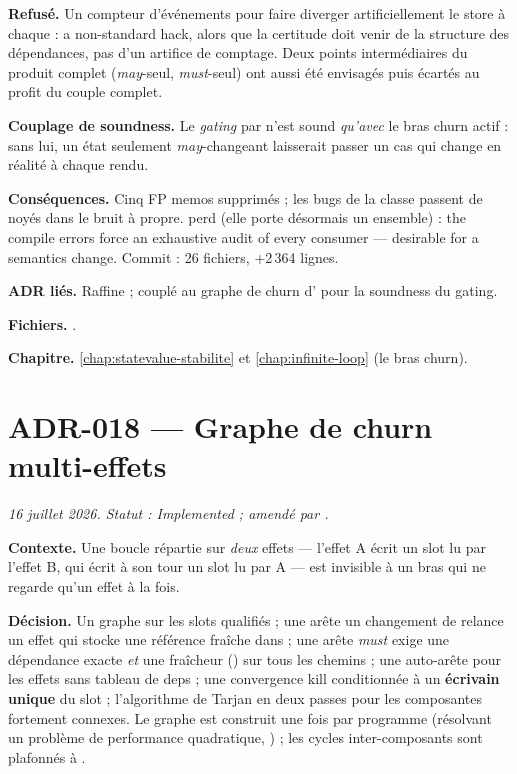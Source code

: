 \textbf{Refusé.} Un compteur d'événements pour faire diverger artificiellement
le store à chaque  : \og a non-standard hack\fg{}, alors que la
certitude doit venir de la structure des dépendances, pas d'un artifice de
comptage. Deux points intermédiaires du produit complet (\emph{may}-seul,
\emph{must}-seul) ont aussi été envisagés puis écartés au profit du couple
complet.

\textbf{Couplage de soundness.} Le \emph{gating} par  n'est
sound \emph{qu'avec} le bras churn actif : sans lui, un état
\og seulement \emph{may}-changeant\fg{} laisserait passer un cas qui change en
réalité à chaque rendu.

\textbf{Conséquences.} Cinq FP \og memos\fg{} supprimés ; les bugs de la
classe  passent de \og noyés dans le bruit\fg{} à \Error{}
propre.  perd  (elle porte désormais un ensemble) :
\og the compile errors force an exhaustive audit of every consumer ---
desirable for a semantics change\fg{}. Commit  : 26 fichiers,
+2\,364 lignes.

\textbf{ADR liés.} Raffine  ; couplé au graphe de churn d' pour
la soundness du gating.

\textbf{Fichiers.} .

\textbf{Chapitre.} \cref{chap:statevalue-stabilite} et \cref{chap:infinite-loop}
(le bras churn).

\section{ADR-018 --- Graphe de churn multi-effets}
\label{adr:18}
\noindent\textit{16 juillet 2026. Statut : Implemented ; amendé par .}

\textbf{Contexte.} Une boucle répartie sur \emph{deux} effets --- l'effet A
écrit un slot lu par l'effet B, qui écrit à son tour un slot lu par A --- est
invisible à un bras  qui ne regarde qu'un effet à la
fois.

\textbf{Décision.} Un graphe sur les slots qualifiés  ;
une arête \og un changement de  relance un effet qui stocke une
référence fraîche dans \fg{} ; une arête \emph{must} exige une
dépendance exacte \emph{et} une fraîcheur () sur tous les chemins ;
une auto-arête pour les effets sans tableau de deps ; une \og convergence
kill\fg{} conditionnée à un \textbf{écrivain unique} du slot ; l'algorithme de
Tarjan en deux passes pour les composantes fortement connexes. Le graphe est
construit une fois par programme (résolvant un problème de performance
quadratique, ) ; les cycles inter-composants sont plafonnés à
\Warning{}.

